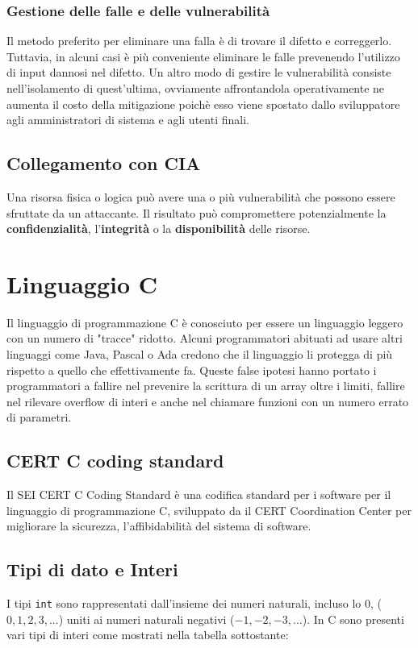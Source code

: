 \subsection{Gestione delle falle e delle vulnerabilità}
Il metodo preferito per eliminare una falla è di trovare il difetto e correggerlo. Tuttavia, in alcuni casi è più conveniente eliminare le falle prevenendo l'utilizzo di input dannosi nel difetto. Un altro modo di gestire le vulnerabilità consiste nell'isolamento di quest'ultima, ovviamente affrontandola operativamente ne aumenta il costo della mitigazione poichè esso viene spostato dallo sviluppatore agli amministratori di sistema e agli utenti finali.

\section{Collegamento con CIA}
Una risorsa fisica o logica può avere una o più vulnerabilità che possono essere sfruttate da un attaccante. Il risultato può compromettere potenzialmente la \textbf{confidenzialità}, l'\textbf{integrità} o la \textbf{disponibilità} delle risorse.

\chapter{Linguaggio C}
Il linguaggio di programmazione C è conosciuto per essere un linguaggio leggero con un numero di "tracce" ridotto.
Alcuni programmatori abituati ad usare altri linguaggi come Java, Pascal o Ada credono che il linguaggio li protegga di più rispetto a quello che effettivamente fa. Queste false ipotesi hanno portato i programmatori a fallire nel prevenire la scrittura di un array oltre i limiti, fallire nel rilevare overflow di interi e anche nel chiamare funzioni con un numero errato di parametri.

\section{CERT C coding standard}
Il SEI CERT C Coding Standard è una codifica standard per i software per il linguaggio di programmazione C, sviluppato da il CERT Coordination Center per migliorare la sicurezza, l'affibidabilità del sistema di software.

\section{Tipi di dato e Interi}
I tipi \verb|int| sono rappresentati dall'insieme dei numeri naturali, incluso lo $0$, ($0, 1, 2, 3, ...$) uniti
ai numeri naturali negativi ($-1, -2, -3, ...$). In C sono presenti vari tipi di interi come mostrati nella tabella sottostante:

